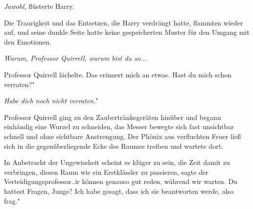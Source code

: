 \glqq \emph{Jawohl}\grqq{}, flüsterte Harry.

Die Traurigkeit und das Entsetzen, die Harry verdrängt hatte, flammten wieder
auf, und seine dunkle Seite hatte keine gespeicherten Muster für den Umgang mit
den Emotionen.

\emph{Warum, Professor Quirrell, warum bist du so... }

Professor Quirrell lächelte. \glqq Das erinnert mich an etwas. Hast du mich
schon verraten?"

\glqq \emph{Habe dich noch nicht verraten.}"

Professor Quirrell ging zu den Zaubertränkegeräten hinüber und begann einhändig
eine Wurzel zu schneiden, das Messer bewegte sich fast unsichtbar schnell und
ohne sichtbare Anstrengung. Der Phönix aus verfluchten Feuer ließ sich in die
gegenüberliegende Ecke des Raumes treiben und wartete dort.

\glqq In Anbetracht der Ungewissheit scheint es klüger zu sein, die Zeit damit
zu verbringen, diesen Raum wie ein Erstklässler zu passieren\grqq{}, sagte der
Verteidigungsprofessor.\grqq{}.ir können genauso gut reden, während wir warten.
Du hattest Fragen, Junge? Ich habe gesagt, dass ich sie beantworten werde, also
frag."

